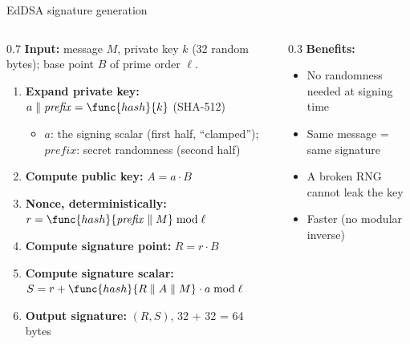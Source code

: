 \ifdefined\PRESENTATION\else\PassOptionsToClass{handout}{beamer}\fi\documentclass[aspectratio=169, lualatex]{beamer}
\begin{document}
\begin{frame}{EdDSA signature generation}
	\begin{columns}
		\begin{column}{0.7\textwidth}
			\textbf{Input:} message $M$, private key $k$ (32 random bytes); base point $B$ of prime order $\ell$.
			\begin{enumerate}
				\item \textbf{Expand private key:} $a \parallel \mathit{prefix} = \func{hash}{k}$ \quad (SHA-512)
				      \begin{itemize}
					      \item $a$: the signing scalar (first half, ``clamped''); $\mathit{prefix}$: secret randomness (second half)
				      \end{itemize}
				\item \textbf{Compute public key:} $A = a \cdot B$
				\item \textbf{Nonce, deterministically:} $r = \func{hash}{\mathit{prefix} \parallel M} \bmod \ell$
				\item \textbf{Compute signature point:} $R = r \cdot B$
				\item \textbf{Compute signature scalar:} $S = r + \func{hash}{R \parallel A \parallel M} \cdot a \bmod \ell$
				\item \textbf{Output signature:} $(R, S)$, 32 + 32 = 64 bytes
			\end{enumerate}
		\end{column}
		\begin{column}{0.3\textwidth}
			\textbf{Benefits:}
			\begin{itemize}
				\item No randomness needed at signing time
				\item Same message = same signature
				\item A broken RNG cannot leak the key
				\item Faster (no modular inverse)
			\end{itemize}
		\end{column}
	\end{columns}
\end{frame}
\end{document}

